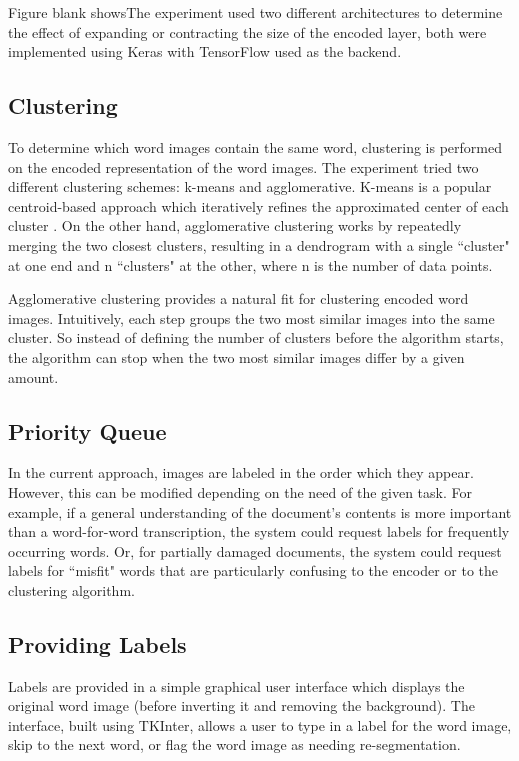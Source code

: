 \documentclass[final]{ukthesis}
\begin{document}
Figure blank showsThe experiment used two different architectures to determine the effect of expanding or contracting the size of the encoded layer, both were implemented using Keras \cite{chollet2015keras} with TensorFlow \cite{abadi2016tensorflow} used as the backend.


\subsection{Clustering}
To determine which word images contain the same word, clustering is performed on the encoded representation of the word images. The experiment tried two different clustering schemes: k-means and agglomerative. K-means is a popular centroid-based approach which iteratively refines the approximated center of each cluster \cite{lloyd1982least,likas2003global}. On the other hand, agglomerative clustering works by repeatedly merging the two closest clusters, resulting in a dendrogram with a single ``cluster" at one end and n ``clusters" at the other, where n is the number of data points.

Agglomerative clustering provides a natural fit for clustering encoded word images. Intuitively, each step groups the two most similar images into the same cluster. So instead of defining the number of clusters before the algorithm starts, the algorithm can stop when the two most similar images differ by a given amount.


\subsection{Priority Queue}
In the current approach, images are labeled in the order which they appear. However, this can be modified depending on the need of the given task. For example, if a general understanding of the document's contents is more important than a word-for-word transcription, the system could request labels for frequently occurring words. Or, for partially damaged documents, the system could request labels for ``misfit" words that are particularly confusing to the encoder or to the clustering algorithm.


\subsection{Providing Labels}
Labels are provided in a simple graphical user interface which displays the original word image (before inverting it and removing the background). The interface, built using TKInter, allows a user to type in a label for the word image, skip to the next word, or flag the word image as needing re-segmentation.
\end{document}
